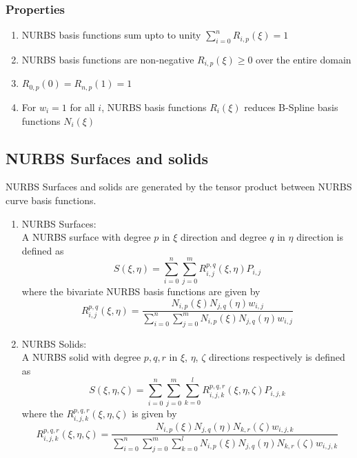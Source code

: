 \documentclass[11pt]{article}
\begin{document}
\subsubsection{Properties }
\begin{enumerate}
	\item NURBS basis functions sum upto to unity $\sum_{i=0}^{n} R_{i,p}(\xi) =1$
	\item NURBS basis functions are non-negative $ R_{i,p}(\xi) \geq 0$ over the entire
	domain
	\item $R_{0,p}(0)=R_{n,p}(1)=1$
	\item For $w_i=1$ for all $i$, NURBS basis functions $R_i(\xi)$ reduces B-Spline basis functions $N_i(\xi)$ 
\end{enumerate}
\subsection{NURBS Surfaces and solids }
NURBS Surfaces and solids are generated by the tensor product between NURBS
curve basis functions.
\begin{enumerate}[leftmargin=*]
	\item NURBS Surfaces: \\
	A NURBS surface with degree $p$ in $\xi$ direction and degree $q$ in $\eta$
	direction is defined as \cite{agrawal2019iga}
	\begin{equation}
	S(\xi,\eta) = \sum_{i=0}^{n}\sum_{j=0}^{m} R_{i,j}^{p,q}(\xi,\eta)  P_{i,j}
	\end{equation}
	where the bivariate NURBS basis functions are given by
	\begin{equation}
	R_{i,j}^{p,q}(\xi,\eta)  =
	\frac{N_{i,p}(\xi)N_{j,q}(\eta)w_{i,j}}{\sum_{i=0}^{n}\sum_{j=0}^{m}N_{i,p}(\xi)N_{j,q}(\eta)w_{i,j}}
	\end{equation}
	\item NURBS Solids: \\
	A NURBS solid with degree $p,q,r$ in $\xi$, $\eta$, $\zeta$ directions
	respectively is defined as \cite{agrawal2019iga}
	\begin{equation}
	S(\xi,\eta,\zeta) = \sum_{i=0}^{n}\sum_{j=0}^{m}\sum_{k=0}^{l}
	R_{i,j,k}^{p,q,r}(\xi,\eta,\zeta)  P_{i,j,k}
	\end{equation}
	where the $R_{i,j,k}^{p,q,r}(\xi,\eta,\zeta)$ is given by
	\begin{equation}
	R_{i,j,k}^{p,q,r}(\xi,\eta,\zeta)  =
	\frac{N_{i,p}(\xi)N_{j,q}(\eta)N_{k,r}(\zeta)w_{i,j,k}}{\sum_{i=0}^{n}\sum_{j=0}^{m}
		\sum_{k=0}^{l} N_{i,p}(\xi)N_{j,q}(\eta)N_{k,r}(\zeta)w_{i,j,k}}
	\end{equation}
\end{enumerate}
\end{document}
